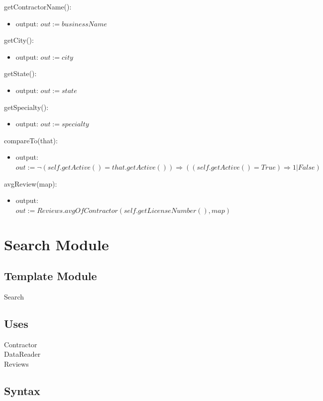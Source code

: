 \documentclass[12pt]{scrartcl}
\begin{document}
\noindent getContractorName():
\begin{itemize}
\item output: $out := businessName$
\end{itemize}

\noindent getCity():
\begin{itemize}
\item output: $out := city$
\end{itemize}

\noindent getState():
\begin{itemize}
\item output: $out := state$
\end{itemize}

\noindent getSpecialty():
\begin{itemize}
\item output: $out := specialty$
\end{itemize} 

\noindent compareTo(that):
\begin{itemize}
\item output: $out := \neg (self.getActive() = that.getActive()) \Rightarrow ((self.getActive() = True) \Rightarrow 1 | False) $ 
\end{itemize} 

\noindent avgReview(map):
\begin{itemize}
\item output: $out := Reviews.avgOfContractor(self.getLicenseNumber(), map) $ 
\end{itemize} 


\newpage

\section {Search Module}

\subsection{Template Module}

Search

\subsection {Uses}

Contractor \\
DataReader \\
Reviews

\subsection {Syntax}
\end{document}
